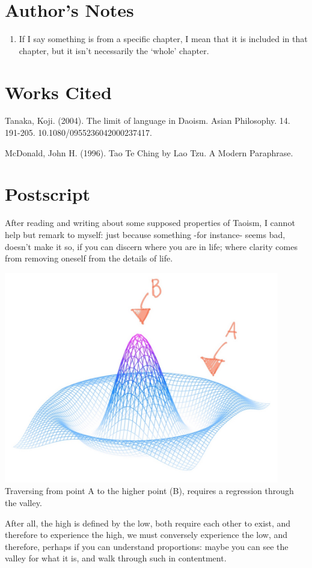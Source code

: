 \newpage

\section*{\centering Author's Notes}

\begin{enumerate}
    \item If I say something is from a specific chapter, I mean that it is included in that chapter, but it isn’t necessarily the ‘whole’ chapter.
\end{enumerate}


\section*{\centering Works Cited}

Tanaka, Koji. (2004). The limit of language in Daoism. Asian Philosophy. 14. 191-205. 10.1080/0955236042000237417.

McDonald, John H. (1996). Tao Te Ching by Lao Tzu. A Modern Paraphrase.

\section*{\centering Postscript}

After reading and writing about some supposed properties of Taoism, I cannot help but remark to myself: just because something -for instance- seems bad, doesn’t make it so, if you can discern where you are in life; where clarity comes from removing oneself from the details of life.

\begin{center}
    \includegraphics[width=0.9\textwidth]{../assets/image3.jpg}
    Traversing from point A to the higher point (B), requires a regression through the valley.
\end{center}

After all, the high is defined by the low, both require each other to exist, and therefore to experience the high, we must conversely experience the low, and therefore, perhaps if you can understand proportions: maybe you can see the valley for what it is, and walk through such in contentment.

